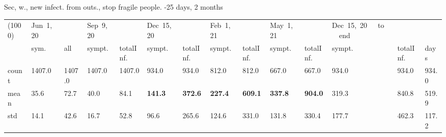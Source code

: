 \documentclass[8pt]{beamer}
\begin{document}
\begin{frame}{Sec, w., new infect. from outs., stop fragile people. -25 days, 2 months}
\begin{table}[H]
\center
\tiny
\begin{tabular}{p{0.3cm}p{0.3cm}p{0.3cm}p{0.3cm}p{0.3cm}p{0.3cm}p{0.3cm}p{0.3cm}p{0.3cm}p{0.3cm}p{0.3cm}p{0.3cm}p{0.3cm}p{0.4cm}}
\toprule
(1000) &  Jun~1,~20 & &  Sep~9,~20 & & Dec~15,~20 & & Feb~1,~21 & & May~1,~21 & & Dec~15,~20~~~to~~~end   \\
{} &  sym. &  all &  sympt. &  totalInf. &  sympt. &  totalInf. &  sympt. &  totalInf. &  sympt. &  totalInf. &  sympt. &  totalInf.  & days\\
\midrule
count &   1407.0 &                     1407.0 &   1407.0 &                     1407.0 &    934.0 &                      934.0 &    812.0 &                      812.0 &    667.0 &                      667.0 &              934.0 &                   934.0 &  934.0 \\
mean  &     35.6 &                       72.7 &     40.0 &                       84.1 &    \textbf{{\color{cyan}141.3}} &                      \textbf{{\color{cyan}372.6}} &    \textbf{227.4} &                     \textbf{609.1} &    \textbf{337.8} &                     \textbf{904.0} &              319.3 &                   840.8 &  519.9 \\
std   &     14.1 &                       42.6 &     16.7 &                       52.8 &     96.6 &                      265.6 &    124.6 &                      331.0 &    131.8 &                      330.4 &               177.7 &                   462.3 &  117.2 \\
\bottomrule
\end{tabular}

\label{selForceWave2NoFrag60-25Tab}
\end{table}


\end{frame}
\end{document}
